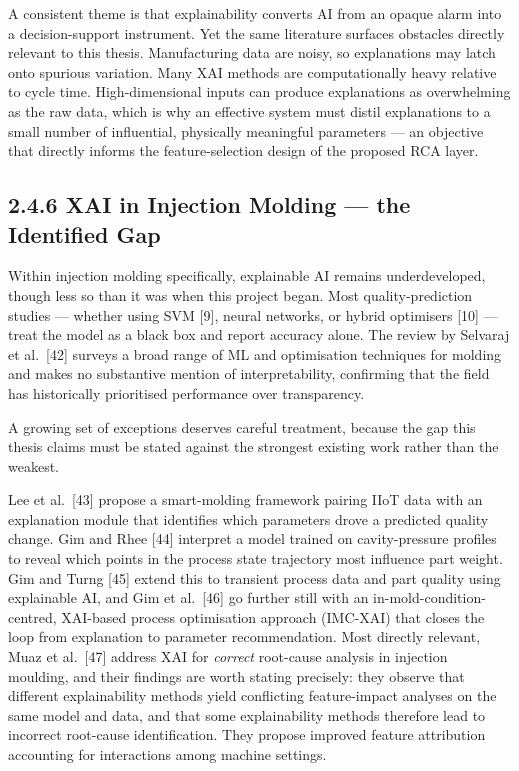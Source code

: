 A consistent theme is that explainability converts AI from an opaque alarm into a decision-support instrument. Yet the same literature surfaces obstacles directly relevant to this thesis. Manufacturing data are noisy, so explanations may latch onto spurious variation. Many XAI methods are computationally heavy relative to cycle time. High-dimensional inputs can produce explanations as overwhelming as the raw data, which is why an effective system must distil explanations to a small number of influential, physically meaningful parameters --- an objective that directly informs the feature-selection design of the proposed RCA layer.

\hypertarget{xai-in-injection-molding-the-identified-gap}{%
\subsection{2.4.6 XAI in Injection Molding --- the Identified Gap}\label{xai-in-injection-molding-the-identified-gap}}

Within injection molding specifically, explainable AI remains underdeveloped, though less so than it was when this project began. Most quality-prediction studies --- whether using SVM {[}9{]}, neural networks, or hybrid optimisers {[}10{]} --- treat the model as a black box and report accuracy alone. The review by Selvaraj et al.~{[}42{]} surveys a broad range of ML and optimisation techniques for molding and makes no substantive mention of interpretability, confirming that the field has historically prioritised performance over transparency.

A growing set of exceptions deserves careful treatment, because the gap this thesis claims must be stated against the strongest existing work rather than the weakest.

Lee et al.~{[}43{]} propose a smart-molding framework pairing IIoT data with an explanation module that identifies which parameters drove a predicted quality change. Gim and Rhee {[}44{]} interpret a model trained on cavity-pressure profiles to reveal which points in the process state trajectory most influence part weight. Gim and Turng {[}45{]} extend this to transient process data and part quality using explainable AI, and Gim et al.~{[}46{]} go further still with an in-mold-condition-centred, XAI-based process optimisation approach (IMC-XAI) that closes the loop from explanation to parameter recommendation. Most directly relevant, Muaz et al.~{[}47{]} address XAI for \emph{correct} root-cause analysis in injection moulding, and their findings are worth stating precisely: they observe that different explainability methods yield conflicting feature-impact analyses on the same model and data, and that some explainability methods therefore lead to incorrect root-cause identification. They propose improved feature attribution accounting for interactions among machine settings.

